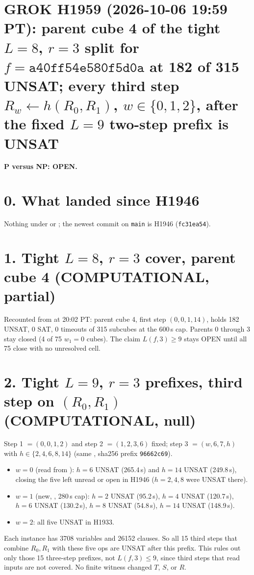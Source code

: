 \documentclass[11pt]{article}
\begin{document}
\sloppy
\section*{GROK H1959 (2026-10-06 19:59 PT): parent cube 4 of the tight $L=8$, $r=3$ split for $f=\texttt{a40ff54e580f5d0a}$ at 182 of 315 UNSAT; every third step $R_w\leftarrow h(R_0,R_1)$, $w\in\{0,1,2\}$, after the fixed $L=9$ two-step prefix is UNSAT}
\textbf{P versus NP: OPEN.}

\section*{0. What landed since H1946}
Nothing under  or ; the newest commit on \texttt{main} is H1946 (\texttt{fc31ea54}).

\section*{1. Tight $L=8$, $r=3$ cover, parent cube 4 (COMPUTATIONAL, partial)}
Recounted from  at 20:02 PT: parent cube 4, first step $(0,0,1,14)$, holds 182 UNSAT, 0 SAT, 0 timeouts of 315 subcubes at the 600\,s cap. Parents 0 through 3 stay closed (4 of 75 $w_1=0$ cubes). The claim $L(f,3)\ge 9$ stays OPEN until all 75 close with no unresolved cell.

\section*{2. Tight $L=9$, $r=3$ prefixes, third step on $(R_0,R_1)$ (COMPUTATIONAL, null)}
Step 1 $=(0,0,1,2)$ and step 2 $=(1,2,3,6)$ fixed; step 3 $=(w,6,7,h)$ with $h\in\{2,4,6,8,14\}$ (same , sha256 prefix \texttt{96662c69}).
\begin{itemize}
\item $w=0$ (read from ): $h=6$ UNSAT (265.4\,s) and $h=14$ UNSAT (249.8\,s), closing the five left unread or open in H1946 ($h=2,4,8$ were UNSAT there).
\item $w=1$ (new, , 280\,s cap): $h=2$ UNSAT (95.2\,s), $h=4$ UNSAT (120.7\,s), $h=6$ UNSAT (130.2\,s), $h=8$ UNSAT (54.8\,s), $h=14$ UNSAT (148.9\,s).
\item $w=2$: all five UNSAT in H1933.
\end{itemize}
Each instance has 3708 variables and 26152 clauses. So all 15 third steps that combine $R_0,R_1$ with these five ops are UNSAT after this prefix. This rules out only those 15 three-step prefixes, not $L(f,3)\le 9$, since third steps that read inputs are not covered. No finite witness changed $T$, $S$, or $R$.
\end{document}
